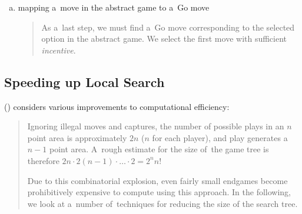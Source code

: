 \begin{enumerate}[(a)]
  \item mapping a~move in the abstract game to a~Go move
    \begin{quotation} \noindent
      As a~last step, we must find a~Go move corresponding to the selected option in the abstract game.
      We select the first move with sufficient \emph{incentive}.
    \end{quotation}
\end{enumerate}

\subsection{Speeding up Local Search}

(\cite{Muller1995computer}) considers various improvements to computational efficiency:
\begin{quotation} \noindent
  Ignoring illegal moves and captures, the number of possible plays in an $n$ point area is approximately $2n$ ($n$ for each player), and play generates a $n-1$ point area.
  A~rough estimate for the size of~the game tree is therefore $2n\cdot2(n-1)\cdot \ldots \cdot2 = 2^n n!$

  Due to this combinatorial explosion, even fairly small endgames become prohibitively expensive to compute using this approach.
  In the following, we look at a~number of~techniques for reducing the size of the search tree.
\end{quotation}

